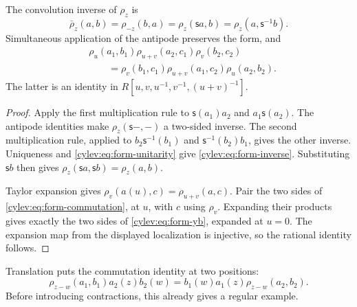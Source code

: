 \begin{lemma}\label{cylev:lem:form}
The convolution inverse of $\rho_z$ is
\begin{equation}\label{cylev:eq:form-inverse}
 \bar\rho_z(a,b)=\rho_{-z}(b,a)
       =\rho_z(\mathsf sa,b)=\rho_z(a,\mathsf s^{-1}b).
\end{equation}
Simultaneous application of the antipode preserves the form, and
\begin{equation}\label{cylev:eq:form-yb}
\begin{split}
 &\rho_u(a_1,b_1)\rho_{u+v}(a_2,c_1)\rho_v(b_2,c_2)\\
 &\qquad=\rho_v(b_1,c_1)\rho_{u+v}(a_1,c_2)\rho_u(a_2,b_2).
\end{split}
\end{equation}
The latter is an identity in $R[u,v,u^{-1},v^{-1},(u+v)^{-1}]$.
\end{lemma}
\begin{proof}
Apply the first multiplication rule to $\mathsf s(a_1)a_2$ and
$a_1\mathsf s(a_2)$. The antipode identities make
$\rho_z(\mathsf s-,-)$ a two-sided inverse.
The second multiplication rule, applied to
$b_2\mathsf s^{-1}(b_1)$ and $\mathsf s^{-1}(b_2)b_1$, gives the
other inverse. Uniqueness and \eqref{cylev:eq:form-unitarity} give
\eqref{cylev:eq:form-inverse}. Substituting $\mathsf sb$ then gives
$\rho_z(\mathsf sa,\mathsf sb)=\rho_z(a,b)$.

Taylor expansion gives $\rho_v(a(u),c)=\rho_{u+v}(a,c)$.
Pair the two sides of \eqref{cylev:eq:form-commutation}, at $u$,
with $c$ using $\rho_v$. Expanding their products gives exactly the
two sides of \eqref{cylev:eq:form-yb}, expanded at $u=0$.
The expansion map from the displayed localization is injective,
so the rational identity follows.
\end{proof}

Translation puts the commutation identity at two positions:
\begin{equation}\label{cylev:eq:two-positions}
 \rho_{z-w}(a_1,b_1)a_2(z)b_2(w)
       =b_1(w)a_1(z)\rho_{z-w}(a_2,b_2).
\end{equation}
Before introducing contractions, this already gives a regular example.

